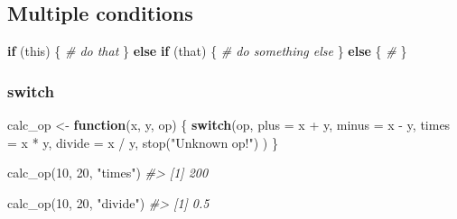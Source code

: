 \documentclass[
]{book}
\newenvironment{Shaded}{\begin{snugshade}}{\end{snugshade}}
\newcommand{\AttributeTok}[1]{\textcolor[rgb]{0.77,0.63,0.00}{#1}}
\newcommand{\CommentTok}[1]{\textcolor[rgb]{0.56,0.35,0.01}{\textit{#1}}}
\newcommand{\ControlFlowTok}[1]{\textcolor[rgb]{0.13,0.29,0.53}{\textbf{#1}}}
\newcommand{\DecValTok}[1]{\textcolor[rgb]{0.00,0.00,0.81}{#1}}
\newcommand{\FunctionTok}[1]{\textcolor[rgb]{0.00,0.00,0.00}{#1}}
\newcommand{\NormalTok}[1]{#1}
\newcommand{\OtherTok}[1]{\textcolor[rgb]{0.56,0.35,0.01}{#1}}
\newcommand{\SpecialCharTok}[1]{\textcolor[rgb]{0.00,0.00,0.00}{#1}}
\newcommand{\StringTok}[1]{\textcolor[rgb]{0.31,0.60,0.02}{#1}}
\begin{document}
\hypertarget{multiple-conditions}{%
\subsection{Multiple conditions}\label{multiple-conditions}}

\begin{Shaded}
\begin{Highlighting}[]
\ControlFlowTok{if}\NormalTok{ (this) \{}
  \CommentTok{\# do that}
\NormalTok{\} }\ControlFlowTok{else} \ControlFlowTok{if}\NormalTok{ (that) \{}
  \CommentTok{\# do something else}
\NormalTok{\} }\ControlFlowTok{else}\NormalTok{ \{}
  \CommentTok{\# }
\NormalTok{\}}
\end{Highlighting}
\end{Shaded}

\hypertarget{switch}{%
\subsubsection{switch}\label{switch}}

\begin{Shaded}
\begin{Highlighting}[]
\NormalTok{calc\_op }\OtherTok{\textless{}{-}} \ControlFlowTok{function}\NormalTok{(x, y, op) \{}
  \ControlFlowTok{switch}\NormalTok{(op,}
         \AttributeTok{plus =}\NormalTok{ x }\SpecialCharTok{+}\NormalTok{ y,}
         \AttributeTok{minus =}\NormalTok{ x }\SpecialCharTok{{-}}\NormalTok{ y,}
         \AttributeTok{times =}\NormalTok{ x }\SpecialCharTok{*}\NormalTok{ y,}
         \AttributeTok{divide =}\NormalTok{ x }\SpecialCharTok{/}\NormalTok{ y,}
         \FunctionTok{stop}\NormalTok{(}\StringTok{"Unknown op!"}\NormalTok{)}
\NormalTok{  )}
\NormalTok{\}}
\end{Highlighting}
\end{Shaded}

\begin{Shaded}
\begin{Highlighting}[]
\FunctionTok{calc\_op}\NormalTok{(}\DecValTok{10}\NormalTok{, }\DecValTok{20}\NormalTok{, }\StringTok{"times"}\NormalTok{)}
\CommentTok{\#\textgreater{} [1] 200}
\end{Highlighting}
\end{Shaded}

\begin{Shaded}
\begin{Highlighting}[]
\FunctionTok{calc\_op}\NormalTok{(}\DecValTok{10}\NormalTok{, }\DecValTok{20}\NormalTok{, }\StringTok{"divide"}\NormalTok{)}
\CommentTok{\#\textgreater{} [1] 0.5}
\end{Highlighting}
\end{Shaded}
\end{document}
